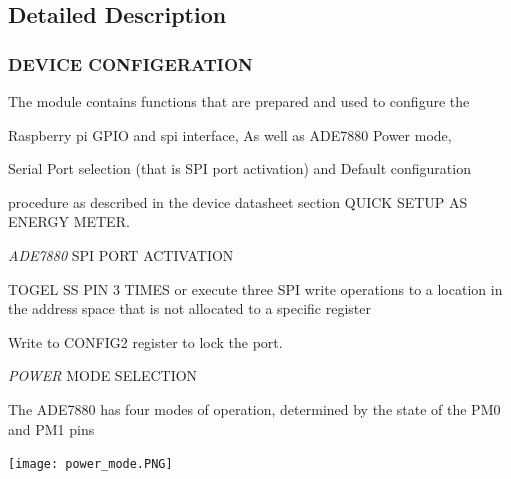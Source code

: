 \subsection{Detailed Description}






 \hypertarget{file3}{}\subsubsection{D\-E\-V\-I\-C\-E C\-O\-N\-F\-I\-G\-E\-R\-A\-T\-I\-O\-N}\label{file3}
The module contains functions that are prepared and used to configure the \par
 Raspberry pi G\-P\-I\-O and spi interface, As well as A\-D\-E7880 Power mode, \par
 Serial Port selection (that is S\-P\-I port activation) and Default configuration \par
 procedure as described in the device datasheet section Q\-U\-I\-C\-K S\-E\-T\-U\-P A\-S E\-N\-E\-R\-G\-Y M\-E\-T\-E\-R.

\par


{\itshape A\-D\-E7880} S\-P\-I P\-O\-R\-T A\-C\-T\-I\-V\-A\-T\-I\-O\-N \par
 \begin{DoxyItemize}
\item T\-O\-G\-E\-L S\-S P\-I\-N 3 T\-I\-M\-E\-S or execute three S\-P\-I write operations to a location in the address space that is not allocated to a specific register \item Write to C\-O\-N\-F\-I\-G2 register to lock the port.\end{DoxyItemize}
{\itshape P\-O\-W\-E\-R} M\-O\-D\-E S\-E\-L\-E\-C\-T\-I\-O\-N \par
 The A\-D\-E7880 has four modes of operation, determined by the state of the P\-M0 and P\-M1 pins  
\begin{DoxyImageNoCaption}
  \mbox{\texttt{[image: power\_mode.PNG]}}
\end{DoxyImageNoCaption}


